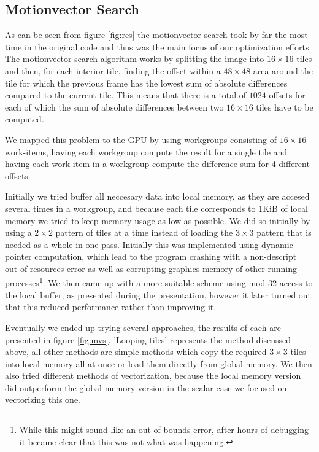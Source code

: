 \subsection{Motionvector Search}
As can be seen from figure \ref{fig:res} the motionvector search took by far the most time in the original code and thus was the main focus of our optimization efforts.
The motionvector search algorithm works by splitting the image into $16\times16$ tiles and then, for each interior tile, finding the offset within a $48\times48$ area around the tile
for which the previous frame has the lowest sum of absolute differences compared to the current tile.  This means that there is a total of $1024$ offsets for each of which
the sum of absolute differences between two $16\times16$ tiles have to be computed.
\par We mapped this problem to the GPU by using workgroups consisting of $16\times16$ work-items, having each workgroup compute the result for a single tile and having each work-item
in a workgroup compute the difference sum for 4 different offsets.
\par Initially we tried buffer all neccesary data into local memory, as they are accesed several times in a workgroup, and because each tile corresponds to 1KiB of local
memory we tried to keep memory usage as low as possible. We did so initially by using a $2\times2$ pattern of tiles at a time instead of loading the $3\times3$ pattern that is needed as a whole
in one pass. Initially this was implemented using dynamic pointer computation, which lead to the program crashing with a non-descript out-of-resources error as well as corrupting
graphics memory of other running processes\footnote{While this might sound like an out-of-bounds error, after hours of debugging it became clear that this was not what was happening.}.
 We then came up with a more suitable scheme using mod 32 access to the local buffer, as presented during the presentation, however it later turned out that this reduced performance rather than improving it.
\par Eventually we ended up trying several approaches, the results of each are presented in figure \ref{fig:mvs}. 'Looping tiles' represents the method discussed above, all other methods are simple methods which copy
the required $3\times3$ tiles into local memory all at once or load them directly from global memory. We then also tried different methods of vectorization, because the local memory version did outperform the global memory version
in the scalar case we focused on vectorizing this one.
